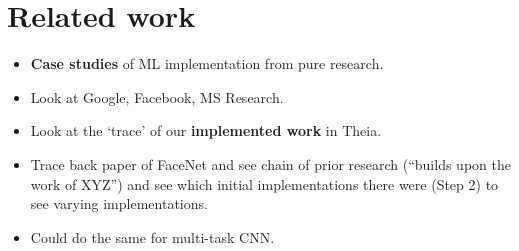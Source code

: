 \section{Related work}



\begin{itemize}
  \item \textbf{Case studies} of ML implementation from pure research.
  \item Look at Google, Facebook, MS Research.
  \item Look at the `trace' of our \textbf{implemented work} in Theia.
  \item Trace back paper of FaceNet and see chain of prior research (``builds upon the work of XYZ'') and see which initial implementations there were (Step 2) to see varying implementations.
  \item Could do the same for multi-task CNN.
\end{itemize}